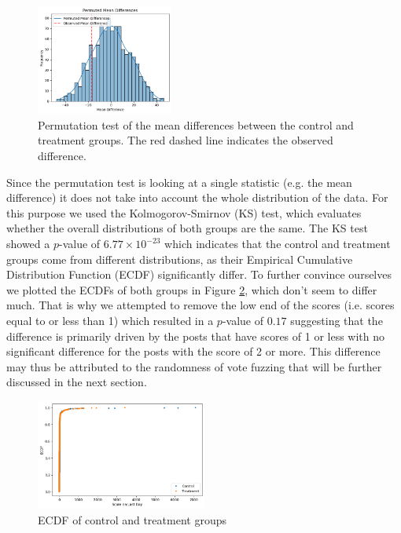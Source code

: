 \documentclass[fleqn,12pt]{article}
\begin{document}
\begin{figure}[h]
  \centering
  \includegraphics[width=0.4\textwidth]{figures/permutation_test.png}
  \caption{Permutation test of the mean differences between the control and treatment groups. The red dashed line indicates the observed difference.}
  \label{fig:mean_difference}
\end{figure}

Since the permutation test is looking at a single statistic (e.g. the mean difference)
it does not take into account the whole distribution of the data. For this
purpose we used the Kolmogorov-Smirnov (KS) test, which evaluates
whether the overall distributions of both groups are the same. 
The KS test showed a $p$-value of $6.77 \times 10^{-23}$ which indicates
that the control and treatment groups come from different distributions,
as their Empirical Cumulative Distribution Function (ECDF) significantly differ.
To further convince ourselves we plotted the ECDFs of both groups in Figure \ref{fig:ecdf}, which 
don't seem to differ much.
That is why we attempted to remove the low end of the scores (i.e. scores equal to or less than 1) which resulted in a $p$-value
of $0.17$ suggesting that the difference is primarily 
driven by the posts that have scores of 1 or less with no 
significant difference for the posts with the score of 2 or more.
This difference may thus be attributed to the randomness of vote fuzzing that will
be further discussed in the next section.

\begin{figure}[h]
  \centering
  \includegraphics[width=0.5\textwidth]{figures/ecdf.png}
  \caption{ECDF of control and treatment groups}
  \label{fig:ecdf}
\end{figure}
\end{document}
